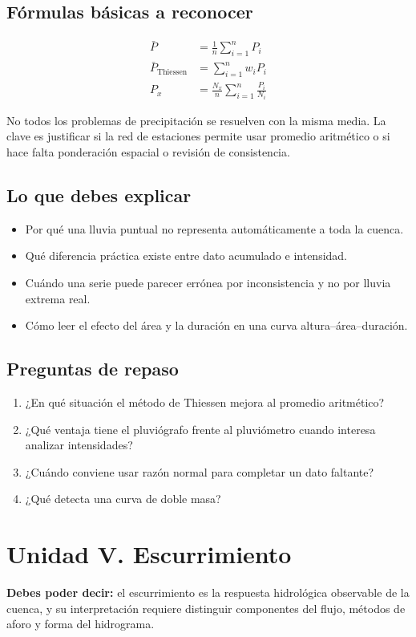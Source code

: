 \documentclass[11pt]{article}
\begin{document}
\subsection{Fórmulas básicas a reconocer}
\begin{align*}
\bar{P} &= \frac{1}{n}\sum_{i=1}^{n} P_i \\
\bar{P}_{\text{Thiessen}} &= \sum_{i=1}^{n} w_i P_i \\
P_x &= \frac{N_x}{n}\sum_{i=1}^{n}\frac{P_i}{N_i}
\end{align*}

\begin{resultbox}
No todos los problemas de precipitación se resuelven con la misma media. La clave es justificar si la red de estaciones permite usar promedio aritmético o si hace falta ponderación espacial o revisión de consistencia.
\end{resultbox}

\subsection{Lo que debes explicar}
\begin{itemize}
\item Por qué una lluvia puntual no representa automáticamente a toda la cuenca.
\item Qué diferencia práctica existe entre dato acumulado e intensidad.
\item Cuándo una serie puede parecer errónea por inconsistencia y no por lluvia extrema real.
\item Cómo leer el efecto del área y la duración en una curva altura--área--duración.
\end{itemize}

\subsection{Preguntas de repaso}
\begin{enumerate}
\item ¿En qué situación el método de Thiessen mejora al promedio aritmético?
\item ¿Qué ventaja tiene el pluviógrafo frente al pluviómetro cuando interesa analizar intensidades?
\item ¿Cuándo conviene usar razón normal para completar un dato faltante?
\item ¿Qué detecta una curva de doble masa?
\end{enumerate}

\section{Unidad V. Escurrimiento}
\begin{conceptbox}
\textbf{Debes poder decir:} el escurrimiento es la respuesta hidrológica observable de la cuenca, y su interpretación requiere distinguir componentes del flujo, métodos de aforo y forma del hidrograma.
\end{conceptbox}
\end{document}
